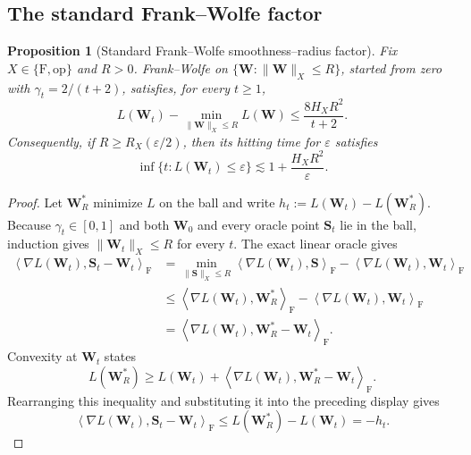\documentclass[11pt]{article}
\newtheorem{proposition}[proposition]{Proposition}
\theoremstyle{definition}
\newcommand{\Sb}{\mathbf{S}}
\newcommand{\Wb}{\mathbf{W}}
\newcommand{\eps}{\varepsilon}
\begin{document}
\subsection{The standard Frank--Wolfe factor}

\begin{proposition}[Standard Frank--Wolfe smoothness--radius factor]
\label{prop:fw-factor-v2}
Fix $X\in\{\mathrm F,\mathrm{op}\}$ and $R>0$.  Frank--Wolfe on
$\{\Wb:\|\Wb\|_X\leq R\}$, started from zero with
$\gamma_t=2/(t+2)$, satisfies, for every $t\geq1$,
\[
 L(\Wb_t)-\min_{\|\Wb\|_X\leq R}L(\Wb)
 \leq\frac{8H_XR^2}{t+2}.
\]
Consequently, if $R\geq R_X(\eps/2)$, then its hitting time for $\eps$
satisfies
\[
 \inf\{t:L(\Wb_t)\leq\eps\}
 \lesssim1+\frac{H_XR^2}{\eps}.
\]
\end{proposition}

\begin{proof}
Let $\Wb_R^*$ minimize $L$ on the ball and write
$h_t:=L(\Wb_t)-L(\Wb_R^*)$.  Because $\gamma_t\in[0,1]$ and both
$\Wb_0$ and every oracle point $\Sb_t$ lie in the ball, induction gives
$\|\Wb_t\|_X\leq R$ for every $t$.  The exact linear oracle gives
\begin{align*}
 \left\langle\nabla L(\Wb_t),\Sb_t-\Wb_t\right\rangle_{\mathrm F}
 &=
 \min_{\|\Sb\|_X\leq R}
 \left\langle\nabla L(\Wb_t),\Sb\right\rangle_{\mathrm F}
 -\left\langle\nabla L(\Wb_t),\Wb_t\right\rangle_{\mathrm F}\\
 &\leq
 \left\langle\nabla L(\Wb_t),\Wb_R^*\right\rangle_{\mathrm F}
 -\left\langle\nabla L(\Wb_t),\Wb_t\right\rangle_{\mathrm F}\\
 &=\left\langle
 \nabla L(\Wb_t),\Wb_R^*-\Wb_t
 \right\rangle_{\mathrm F}.
\end{align*}
Convexity at $\Wb_t$ states
\[
 L(\Wb_R^*)
 \geq L(\Wb_t)
 +\left\langle\nabla L(\Wb_t),\Wb_R^*-\Wb_t\right\rangle_{\mathrm F}.
\]
Rearranging this inequality and substituting it into the preceding display
gives
\[
 \left\langle\nabla L(\Wb_t),\Sb_t-\Wb_t\right\rangle_{\mathrm F}
 \leq L(\Wb_R^*)-L(\Wb_t)=-h_t.
\]


\end{proof}
\end{document}
